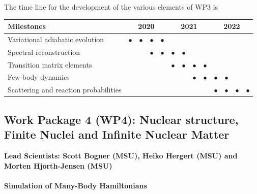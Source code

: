 \documentclass[10pt]{article}
\begin{document}
 The time line for the development of the various elements of WP3 is
\begin{footnotesize}
\begin{center}
\begin{tabular}{|l|c|c|c|c|c|c|c|c|c|c|c|c|}
\hline
\multicolumn{1}{|l}{Milestones } & \multicolumn{4}{|c|}{ 2020 } & \multicolumn{4}{c|}{ 2021 } & \multicolumn{4}{c|}{ 2022 } \\
\hline
Variational adiabatic evolution &$\bullet$ &$\bullet$ &$\bullet$ &$\bullet$ & & & & & & & &  \\
\hline
Spectral reconstruction & & & $\bullet$ &$\bullet$ &$\bullet$ &$\bullet$ & & & & & &  \\
\hline
Transition matrix elements & & & & & $\bullet$ &$\bullet$ &$\bullet$ &$\bullet$ & & & &   \\
\hline
Few-body dynamics & & & & & & & $\bullet$ &$\bullet$ &$\bullet$ &$\bullet$ & &\\
\hline
Scattering and reaction probabilities & & & & & & & & & $\bullet$ &$\bullet$ &$\bullet$ &$\bullet$ \\
\hline

\end{tabular}
\end{center}
\end{footnotesize}

\subsection{Work Package 4 (WP4): Nuclear structure, Finite Nuclei and Infinite Nuclear Matter}
{\bf Lead Scientists: Scott Bogner (MSU), Heiko Hergert (MSU) and Morten Hjorth-Jensen (MSU)}
\paragraph{Simulation of Many-Body Hamiltonians}
\end{document}
